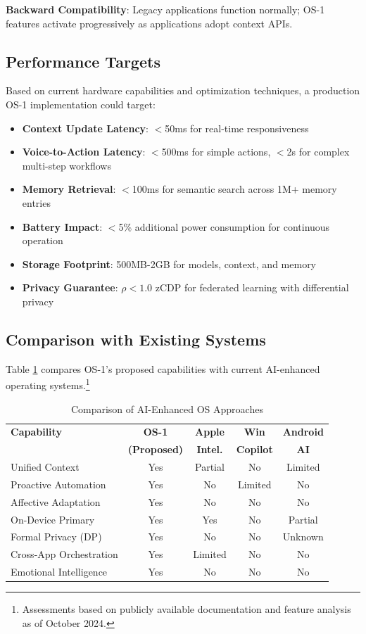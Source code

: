 \documentclass[conference]{IEEEtran}
\begin{document}
\textbf{Backward Compatibility}: Legacy applications function normally; OS-1 features activate progressively as applications adopt context APIs.

\subsection{Performance Targets}

Based on current hardware capabilities and optimization techniques, a production OS-1 implementation could target:

\begin{itemize}
\item \textbf{Context Update Latency}: $<$50ms for real-time responsiveness
\item \textbf{Voice-to-Action Latency}: $<$500ms for simple actions, $<$2s for complex multi-step workflows
\item \textbf{Memory Retrieval}: $<$100ms for semantic search across 1M+ memory entries
\item \textbf{Battery Impact}: $<$5\% additional power consumption for continuous operation
\item \textbf{Storage Footprint}: 500MB-2GB for models, context, and memory
\item \textbf{Privacy Guarantee}: $\rho < 1.0$ zCDP for federated learning with differential privacy
\end{itemize}

\subsection{Comparison with Existing Systems}

Table \ref{tab:comparison} compares OS-1's proposed capabilities with current AI-enhanced operating systems.\footnote{Assessments based on publicly available documentation and feature analysis as of October 2024.}

\begin{table}[h]
\centering
\caption{Comparison of AI-Enhanced OS Approaches}
\label{tab:comparison}
\begin{tabular}{|l|c|c|c|c|}
\hline
\textbf{Capability} & \textbf{OS-1} & \textbf{Apple} & \textbf{Win} & \textbf{Android} \\
 & \textbf{(Proposed)} & \textbf{Intel.} & \textbf{Copilot} & \textbf{AI} \\
\hline
Unified Context & Yes & Partial & No & Limited \\
Proactive Automation & Yes & No & Limited & No \\
Affective Adaptation & Yes & No & No & No \\
On-Device Primary & Yes & Yes & No & Partial \\
Formal Privacy (DP) & Yes & No & No & Unknown \\
Cross-App Orchestration & Yes & Limited & No & No \\
Emotional Intelligence & Yes & No & No & No \\
\hline
\end{tabular}
\end{table}
\end{document}

